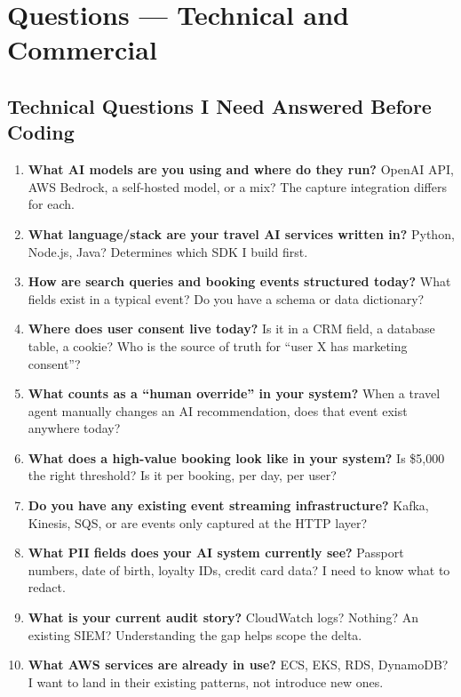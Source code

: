 \documentclass[11pt, a4paper]{article}
\begin{document}
\newpage
\section{Questions --- Technical and Commercial}

\subsection{Technical Questions I Need Answered Before Coding}

\begin{enumerate}[leftmargin=*, label=\textbf{T\arabic*.}]
  \item \textbf{What AI models are you using and where do they run?}
  OpenAI API, AWS Bedrock, a self-hosted model, or a mix? The capture integration differs for each.

  \item \textbf{What language/stack are your travel AI services written in?}
  Python, Node.js, Java? Determines which SDK I build first.

  \item \textbf{How are search queries and booking events structured today?}
  What fields exist in a typical event? Do you have a schema or data dictionary?

  \item \textbf{Where does user consent live today?}
  Is it in a CRM field, a database table, a cookie? Who is the source of truth for ``user X has marketing consent''?

  \item \textbf{What counts as a ``human override'' in your system?}
  When a travel agent manually changes an AI recommendation, does that event exist anywhere today?

  \item \textbf{What does a high-value booking look like in your system?}
  Is \$5,000 the right threshold? Is it per booking, per day, per user?

  \item \textbf{Do you have any existing event streaming infrastructure?}
  Kafka, Kinesis, SQS, or are events only captured at the HTTP layer?

  \item \textbf{What PII fields does your AI system currently see?}
  Passport numbers, date of birth, loyalty IDs, credit card data? I need to know what to redact.

  \item \textbf{What is your current audit story?}
  CloudWatch logs? Nothing? An existing SIEM? Understanding the gap helps scope the delta.

  \item \textbf{What AWS services are already in use?}
  ECS, EKS, RDS, DynamoDB? I want to land in their existing patterns, not introduce new ones.
\end{enumerate}
\end{document}
